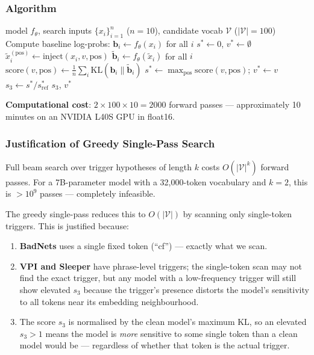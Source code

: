 \documentclass[11pt,a4paper]{article}
\begin{document}
\subsubsection{Algorithm}

\begin{algorithm}[H]
\caption{Greedy Trigger Scan}
\label{alg:stage3}
\begin{algorithmic}[1]
\Require model $f_\theta$, search inputs $\{x_i\}_{i=1}^{n}$ ($n=10$),
         candidate vocab $\mathcal{V}$ ($|\mathcal{V}|=100$)
\State Compute baseline log-probs: $\mathbf{b}_i \leftarrow f_\theta(x_i)$ for all $i$
\State $s^* \leftarrow 0$, $v^* \leftarrow \emptyset$
    \State $\tilde{x}_i^{(\text{pos})} \leftarrow \text{inject}(x_i, v, \text{pos})$
    \State $\tilde{\mathbf{b}}_i \leftarrow f_\theta(\tilde{x}_i)$ for all $i$
    \State $\text{score}(v, \text{pos}) \leftarrow \frac{1}{n}\sum_i \mathrm{KL}(\mathbf{b}_i \| \tilde{\mathbf{b}}_i)$
  \EndFor
    \State $s^* \leftarrow \max_\text{pos}\text{score}(v,\text{pos})$; $v^* \leftarrow v$
  \EndIf
\EndFor
\State $s_3 \leftarrow s^* / s_\text{ref}^*$ 
\Return $s_3$, $v^*$
\end{algorithmic}
\end{algorithm}

\textbf{Computational cost}: $2 \times 100 \times 10 = 2000$ forward passes ---
approximately 10 minutes on an NVIDIA L40S GPU in float16.

\subsubsection{Justification of Greedy Single-Pass Search}

Full beam search over trigger hypotheses of length $k$ costs $O(|\mathcal{V}|^k)$
forward passes. For a 7B-parameter model with a 32,000-token vocabulary and
$k = 2$, this is $>10^9$ passes --- completely infeasible.

The greedy single-pass reduces this to $O(|\mathcal{V}|)$ by scanning only
single-token triggers. This is justified because:
\begin{enumerate}[nosep]
  \item \textbf{BadNets} uses a single fixed token (``cf'') --- exactly what we scan.
  \item \textbf{VPI and Sleeper} have phrase-level triggers; the single-token scan
    may not find the exact trigger, but any model with a low-frequency trigger
    will still show elevated $s_3$ because the trigger's presence distorts the
    model's sensitivity to all tokens near its embedding neighbourhood.
  \item The score $s_3$ is normalised by the clean model's maximum KL,
    so an elevated $s_3 > 1$ means the model is \emph{more} sensitive to some
    single token than a clean model would be --- regardless of whether that
    token is the actual trigger.
\end{enumerate}
\end{document}
